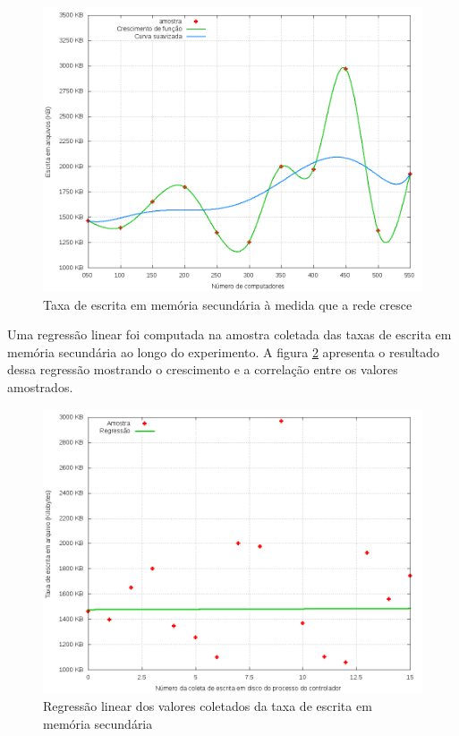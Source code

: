 \begin{figure}[!htb]
    \centering
    \label{fig:writing-rate-growth}
    \includegraphics[width=\linewidth]{img/writing-rate-growth}
    \caption{Taxa de escrita em memória secundária à medida que a rede cresce}
\end{figure}

Uma regressão linear foi computada na amostra coletada das taxas de escrita
em memória secundária ao longo do experimento.
A figura \ref{fig:scatter-writing-rate} apresenta o resultado dessa regressão
mostrando o crescimento e a correlação entre os valores amostrados.

\begin{figure}[!htb]
    \centering
    \label{fig:scatter-writing-rate}
    \includegraphics[width=\linewidth]{img/scatter-writing-rate}
    \caption{Regressão linear dos valores coletados da taxa de escrita em 
    memória secundária}
\end{figure}

